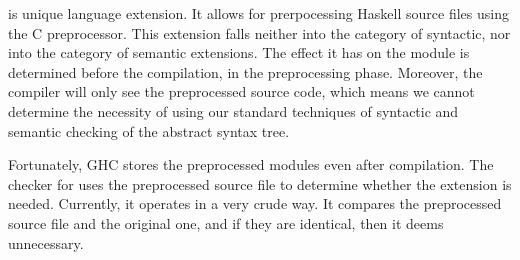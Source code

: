 \documentclass[main.tex]{subfiles}
\begin{document}
	
	 is unique language extension. It allows for prerpocessing Haskell source files using the C preprocessor. This extension falls neither into the category of syntactic, nor into the category of semantic extensions. The effect it has on the module is determined before the compilation, in the preprocessing phase. Moreover, the compiler will only see the preprocessed source code, which means we cannot determine the necessity of  using our standard techniques of syntactic and semantic checking of the abstract syntax tree.
	
	Fortunately, GHC stores the preprocessed modules even after compilation. The checker for  uses the preprocessed source file to determine whether the extension is needed. Currently, it operates in a very crude way. It compares the preprocessed source file and the original one, and if they are identical, then it deems  unnecessary.
	
\end{document}
